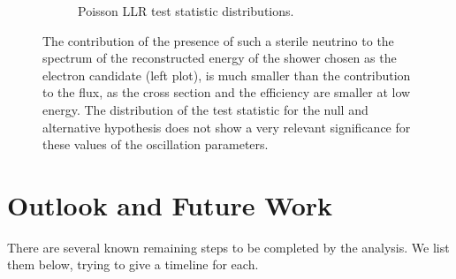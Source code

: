 \documentclass[a4paper]{article}
\begin{document}
\begin{figure}[ht]
\begin{center}
\begin{subfigure}[b]{0.45\textwidth}
    \caption{Poisson LLR test statistic distributions.}
    \end{subfigure}
\caption{The contribution of the presence of such a sterile neutrino to the spectrum of the reconstructed energy of the shower chosen as the electron candidate (left plot), is much smaller than the contribution to the flux, as the cross section and the efficiency are smaller at low energy.
The distribution of the test statistic for the null and alternative hypothesis does not show a very relevant significance for these values of the oscillation parameters.}
\label{fig:oscillation_sensitivity}
\end{center}
\end{figure}




\newpage

\section{Outlook and Future Work}
\par There are several known remaining steps to be completed by the analysis. We list them below, trying to give a timeline for each. 
\end{document}
